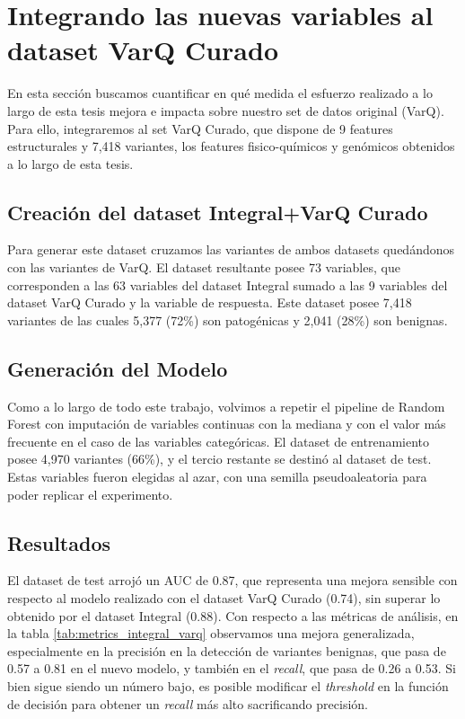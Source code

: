 \section{Integrando las nuevas variables al dataset VarQ Curado}

En esta sección buscamos cuantificar en qué medida el esfuerzo realizado a lo largo de esta tesis mejora e impacta sobre nuestro set de datos original (VarQ). Para ello, integraremos al set VarQ Curado, que dispone de 9 features estructurales y 7,418 variantes, los features fisico-químicos y genómicos obtenidos a lo largo de esta tesis.

\subsection{Creación del dataset Integral+VarQ Curado}
Para generar este dataset cruzamos las variantes de ambos datasets quedándonos con las variantes de VarQ. El dataset resultante posee 73 variables, que corresponden a las 63 variables del dataset Integral sumado a las 9 variables del dataset VarQ Curado y la variable de respuesta. Este dataset posee 7,418 variantes de las cuales 5,377 (72\%) son patogénicas y 2,041 (28\%) son benignas. 

\subsection{Generación del Modelo}
Como a lo largo de todo este trabajo, volvimos a repetir el pipeline de Random Forest con imputación de variables continuas con la mediana y con el valor más frecuente en el caso de las variables categóricas. El dataset de entrenamiento posee 4,970 variantes (66\%), y el tercio restante se destinó al dataset de test. Estas variables fueron elegidas al azar, con una semilla pseudoaleatoria para poder replicar el experimento.  

\subsection{Resultados}
El dataset de test arrojó un AUC de 0.87, que representa una mejora sensible con respecto al modelo realizado con el dataset VarQ Curado (0.74), sin superar lo obtenido por el dataset Integral (0.88). Con respecto a las métricas de análisis, en la tabla \ref{tab:metrics_integral_varq} observamos una mejora generalizada, especialmente en la precisión en la detección de variantes benignas, que pasa de 0.57 a 0.81 en el nuevo modelo, y también en el \textit{recall}, que pasa de 0.26 a 0.53. Si bien sigue siendo un número bajo, es posible modificar el \textit{threshold} en la función de decisión para obtener un \textit{recall} más alto sacrificando precisión. 

